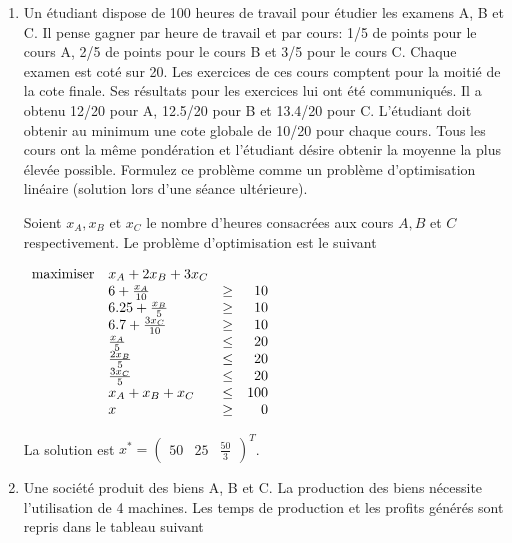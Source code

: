 \begin{enumerate}


  \item Un étudiant dispose de 100 heures de travail pour étudier les examens A, B et C. Il pense gagner par heure de travail et par
    cours: 1/5 de points pour le cours A, 2/5 de points pour le cours B et 3/5 pour le cours C. Chaque examen est coté sur 20. Les
    exercices de ces cours comptent pour la moitié de la cote finale. Ses résultats pour les exercices lui ont été communiqués. Il a
    obtenu 12/20 pour A, 12.5/20 pour B et 13.4/20 pour C.  L'étudiant doit obtenir au minimum une cote globale de 10/20 pour chaque cours. Tous
    les cours ont la même pondération et l'étudiant désire obtenir la  moyenne la plus élevée possible.  Formulez ce problème comme un problème d'optimisation
    linéaire (solution lors d'une séance ultérieure).
    \begin{solution}
      Soient $x_{A}, x_{B}\text{ et }x_{C}$ le nombre d'heures consacrées aux cours $A, B$ et $C$ respectivement.
      Le problème d'optimisation est le suivant

      $
      \begin{array}{llcr}
        \mbox{maximiser} & x_A + 2x_B + 3x_C\\
        & 6 + \frac{x_A}{10} & \geq & 10\\
        & 6.25 + \frac{x_B}{5} & \geq & 10\\
        & 6.7 + \frac{3x_C}{10} & \geq & 10\\
        & \frac{x_A}{5} & \leq & 20\\
        & \frac{2x_B}{5} & \leq & 20\\
        & \frac{3x_C}{5} & \leq & 20\\
        & x_A + x_B + x_C & \leq & 100\\
        & x & \geq & 0
      \end{array}
      $

      La solution est
      $x^{*} = \begin{pmatrix}
        50 & 25 & \frac{50}{3}
      \end{pmatrix}^{T}$.

    \end{solution}


  \item Une société produit des biens A, B et C. La production des biens nécessite l'utilisation de 4 machines. Les temps de production
    et les profits générés sont repris dans le tableau suivant\\


\end{enumerate}
